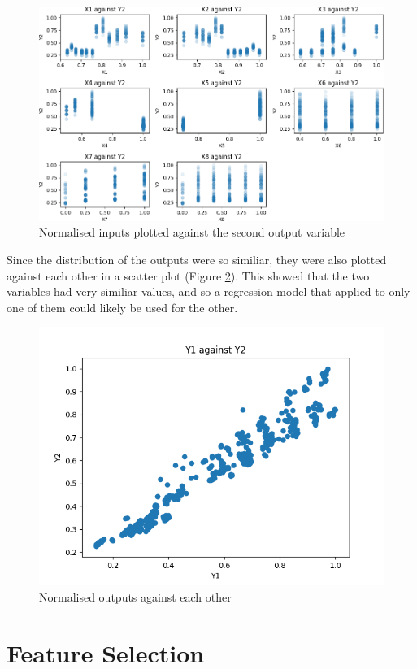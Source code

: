 \documentclass[12pt]{article}
\begin{document}
\begin{figure}[!ht]
\centering
\includegraphics[width=0.8 \linewidth]{images/XsVsY1}
\caption{Normalised inputs plotted against the second output variable}
\label{fig:xvsy1}
\end{figure}

\FloatBarrier

Since the distribution of the outputs were so similiar, they were also plotted against each other in a scatter plot (Figure \ref{fig:y1vsy2}). This showed that the two variables had very similiar values, and so a regression model that applied to only one of them could likely be used for the other.

\begin{figure}[!ht]
\centering
\includegraphics[width=0.8 \linewidth]{images/Y1vsY2}
\caption{Normalised outputs against each other}
\label{fig:y1vsy2}
\end{figure}

\FloatBarrier

\part{Feature Selection}
\end{document}
